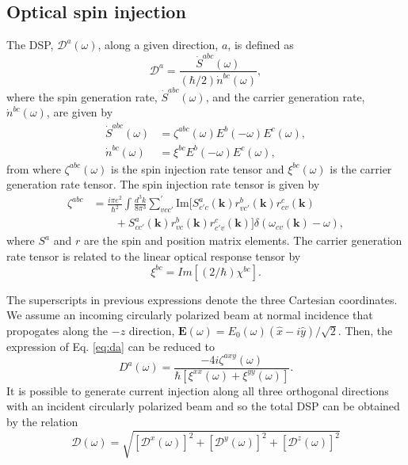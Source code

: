 \documentclass[pss]{wiley2sp} %
\begin{document}
\subsection{Optical spin injection}\label{sec:theory-DSP}

The DSP, $\mathcal{D}^{a}(\omega)$, along a given direction, $a$, is defined as
\begin{equation}\label{eq:da}
\mathcal{D}^{a}=\frac{\dot{S}^{abc}(\omega)}{(\hbar/2)\dot{n}^{bc}(\omega)},
\end{equation}
where the spin generation rate, $\dot{S}^{abc}(\omega)$, and the carrier generation rate, $\dot{n}^{bc}(\omega)$,  are given by 
\begin{align*}
\dot{S}^{abc}(\omega) &= \zeta^{abc}(\omega)E^{b}(-\omega)E^{c}(\omega), \nonumber \\ 
\dot{n}^{bc}(\omega)  &= \xi^{bc}E^{b}(-\omega)E^{c}(\omega),
\end{align*}
from where $\zeta^{abc}(\omega)$ is the spin injection rate tensor and $\xi^{bc}(\omega)$ is the carrier generation rate tensor. The spin injection rate tensor is given by
\begin{align*}\label{eq:zeta}
\zeta^{abc} &= \frac{i\pi e^{2}}{\hbar^{2}}\int\frac{d^{3}k}{8\pi^{3}}
\sum_{vcc'}^{\prime}\text{Im}\bigl[S^{a}_{c'c}(\textbf{k})
r^{b}_{vc'}(\textbf{k})r^{c}_{cv}(\textbf{k})\nonumber\\
&\qquad+S^{a}_{cc'}(\textbf{k})
r^{b}_{vc}(\textbf{k})r^{c}_{c'v}(\textbf{k})\bigr]
\delta(\omega_{cv}(\textbf{k})-\omega),
\end{align*}
where $S^{a}$ and $r$ are the spin and position matrix elements. The carrier generation rate tensor is related to the linear optical response tensor by 
\begin{equation*}
\xi^{bc}=Im[(2/\hbar)\chi^{bc}].
\end{equation*}

The superscripts in previous expressions denote the three Cartesian coordinates. We assume an incoming circularly polarized beam at normal incidence that propogates along the $-z$ direction, $\mathbf{E}(\omega) = E_{0}(\omega)(\hat{x} - i\hat{y})/\sqrt{2}$. Then, the expression of Eq. \eqref{eq:da} can be reduced to
\begin{equation}\label{eq:D^i}
D^{a}(\omega) = 
\frac{-4i\zeta^{axy}(\omega)}
    {\hbar\left[\xi^{xx}(\omega) + \xi^{yy}(\omega)\right]}.
\end{equation}
It is possible to generate current injection along all three orthogonal directions with
an incident circularly polarized beam and so the total DSP can be obtained by the relation
\begin{equation}\label{eq:dsptotal}
\mathcal{D}(\omega) = \sqrt{ [\mathcal{D}^{x}(\omega)]^{2} + [\mathcal{D}^{y}(\omega)]^{2} +[\mathcal{D}^{z}(\omega)]^{2}  }
\end{equation}
\end{document}
